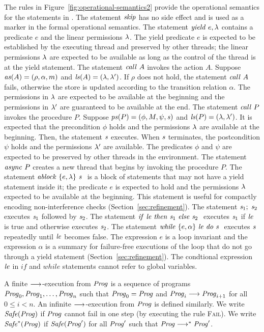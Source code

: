 The rules in Figure~\ref{fig:operational-semantics2} provide the operational semantics for the statements in \civl.
The statement $\mathit{skip}$ has no side effect and is used as a marker in the formal operational semantics.
The statement $\mathit{yield}\ e,\lambda$ contains a predicate $e$ and the linear permissions $\lambda$.
The yield predicate $e$ is expected to be established by the executing thread and preserved by other threads;
the linear permissions $\lambda$ are expected to be available as long as the control of the thread
is at the yield statement.
The statement $\mathit{call}\ A$ invokes the action $A$.
Suppose $\mathit{as}(A) = (\rho, \alpha, m)$ and $\mathit{ls}(A) = (\lambda, \lambda')$.
If $\rho$ does not hold, the statement $\mathit{call}\ A$ fails, 
otherwise the store is updated according to the transition relation $\alpha$.
The permissions in $\lambda$ are expected to be available at the beginning
and the permissions in $\lambda'$ are guaranteed to be available at the end.
The statement $\mathit{call}\ P$ invokes the procedure $P$.
Suppose $\mathit{ps}(P) = (\phi, M, \psi, \mathit{s})$ and $\mathit{ls}(P) = (\lambda, \lambda')$.
It is expected that the precondition $\phi$ holds and the permissions $\lambda$ are available at the beginning.
Then, the statement $\mathit{s}$ executes.
When $\mathit{s}$ terminates, the postcondition $\psi$ holds and the permissions $\lambda'$ are available.
The predicates $\phi$ and $\psi$ are expected to be preserved by other threads in the environment. 
The statement $\mathit{async}\ P$ creates a new thread that begins by invoking the procedure $P$.
The statement $\mathit{ablock}\ {\{e,\lambda\}}\ {\mathit{s}}\ $ is a block of statements that may not have a yield statement inside it;
the predicate $e$ is expected to hold and the permissions $\lambda$ expected to be available at the beginning.
This statement is useful for compactly encoding non-interference checks (Section~\ref{sec:refinement}).
The statement $\mathit{s}_1;\;\mathit{s}_2$ executes $\mathit{s}_1$ followed by $\mathit{s}_2$.
The statement ${\mathit{if}\ {\mathit{le}}\ }{\mathit{then}\ {\mathit{s}_1}\ }{\mathit{else}\ {\mathit{s}_2}\ }$ executes $\mathit{s}_1$ if $\mathit{le}$ is true and otherwise executes $\mathit{s}_2$.
The statement $\mathit{while}\ \{{e,\alpha}\}\ {{\mathit{le}}\ } \mathit{do}\ {{\mathit{s}}\ }$ executes $\mathit{s}$ repeatedly until $\mathit{le}$ becomes false.
The expression $e$ is a loop invariant and the expression $\alpha$ is a summary for failure-free executions of the loop that do not go 
through a yield statement (Section~\ref{sec:refinement}).
The condtional expression $\mathit{le}$ in $\mathit{if}$ and $\mathit{while}$ statements cannot refer to global variables.

A finite $\longrightarrow$-execution from $\mathit{Prog}$ is a sequence of programs $\mathit{Prog}_0,\mathit{Prog}_1,\ldots,\mathit{Prog}_n$ such that $\mathit{Prog}_0 = \mathit{Prog}$ 
and $\mathit{Prog}_i \longrightarrow \mathit{Prog}_{i+1}$ for all $0 \leq i < n$.
An infinite $\longrightarrow$-execution from $\mathit{Prog}$ is defined similarly.
We write $\mathit{Safe}(\mathit{Prog})$ if $\mathit{Prog}$ cannot fail in one step (by executing the rule \textsc{Fail}).
We write $\mathit{Safe}^*(\mathit{Prog})$ if $\mathit{Safe}(\mathit{Prog}')$ for all $\mathit{Prog}'$ such that $\mathit{Prog} \longrightarrow^* \mathit{Prog}'$.

